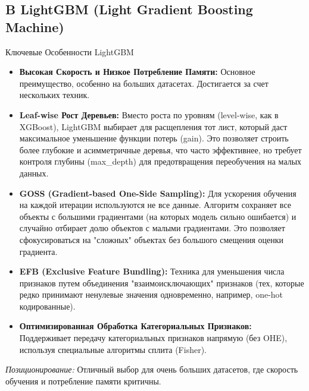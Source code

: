 \subsection{B LightGBM (Light Gradient Boosting Machine)}
\begin{myblock}{Ключевые Особенности LightGBM}
    \begin{itemize}[nosep, leftmargin=*]
        \item \textbf{Высокая Скорость и Низкое Потребление Памяти:} Основное преимущество, особенно на больших датасетах. Достигается за счет нескольких техник.
        \item \textbf{Leaf-wise Рост Деревьев:} Вместо роста по уровням (level-wise, как в XGBoost), LightGBM выбирает для расщепления тот лист, который даст максимальное уменьшение функции потерь (gain). Это позволяет строить более глубокие и асимметричные деревья, что часто эффективнее, но требует контроля глубины (max\_depth) для предотвращения переобучения на малых данных.
        \item \textbf{GOSS (Gradient-based One-Side Sampling):} Для ускорения обучения на каждой итерации используются не все данные. Алгоритм сохраняет все объекты с большими градиентами (на которых модель сильно ошибается) и случайно отбирает долю объектов с малыми градиентами. Это позволяет сфокусироваться на "сложных" объектах без большого смещения оценки градиента.
        \item \textbf{EFB (Exclusive Feature Bundling):} Техника для уменьшения числа признаков путем объединения "взаимоисключающих" признаков (тех, которые редко принимают ненулевые значения одновременно, например, one-hot кодированные).
        \item \textbf{Оптимизированная Обработка Категориальных Признаков:} Поддерживает передачу категориальных признаков напрямую (без OHE), используя специальные алгоритмы сплита (Fisher).
    \end{itemize}
    \textit{Позиционирование:} Отличный выбор для очень больших датасетов, где скорость обучения и потребление памяти критичны.
\end{myblock}

